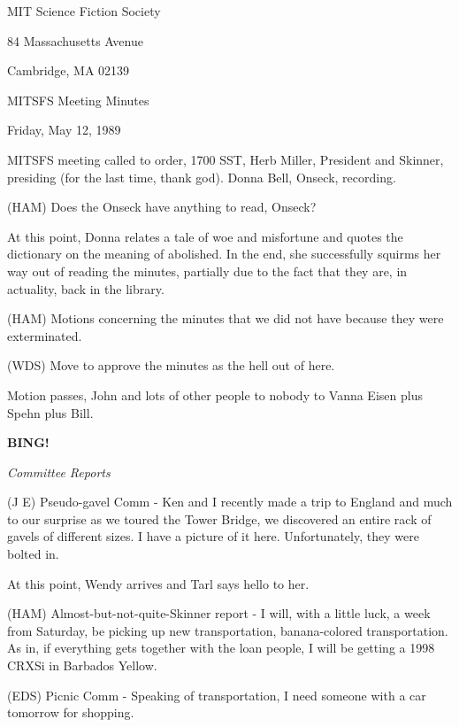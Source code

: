 \documentclass[12pt]{article}
\newcommand{\bing}{{\bf BING!} }
\newcommand{\goto}[1]{\bing \vskip 12pt \centerline{{\em{#1}}}}
\begin{document}
\begin{center}

MIT Science Fiction Society 

84 Massachusetts Avenue

Cambridge, MA 02139

\vspace{12pt}

MITSFS Meeting Minutes 

Friday, May 12, 1989

\end{center}
 
\vspace{18pt}

\setlength{\parskip}{6pt}

\noindent
MITSFS meeting called to order, 1700 SST, Herb Miller, President and Skinner, presiding (for the last time, thank god). Donna Bell, Onseck, recording.

(HAM) Does the Onseck have anything to read, Onseck?

At this point, Donna relates a tale of woe and misfortune and quotes the dictionary on the meaning of abolished.  In the end, she successfully squirms her way out of reading the minutes, partially due to the fact that they are, in actuality, back in the library.

(HAM) Motions concerning the minutes that we did not have because they were exterminated.

(WDS) Move to approve the minutes as the hell out of here.

Motion passes, John and lots of other people to nobody to Vanna Eisen plus Spehn plus Bill.

\goto{Committee Reports}

(J E) Pseudo-gavel Comm - Ken and I recently made a trip to England and much to our surprise as we toured the Tower Bridge, we discovered an entire rack of gavels of different sizes. I have a picture of it here. Unfortunately, they were bolted in.

At this point, Wendy arrives and Tarl says hello to her.

(HAM) Almost-but-not-quite-Skinner report - I will, with a little luck, a week from Saturday, be picking up new transportation, banana-colored transportation. As in, if everything gets together with the loan people, I will be getting a 1998 CRXSi in Barbados Yellow.

(EDS) Picnic Comm - Speaking of transportation, I need someone with a car tomorrow for shopping.
\end{document}
